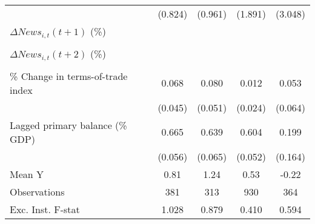 {\begin{tabular}{l*{4}{c}}
                    &     (0.824)         &     (0.961)         &     (1.891)         &     (3.048)         \\
\addlinespace
$ \Delta News_{i,t}(t+1)$ (\%)&                     &                     &                     &                     \\
                    &                     &                     &                     &                     \\
\addlinespace
$ \Delta News_{i,t}(t+2)$ (\%)&                     &                     &                     &                     \\
                    &                     &                     &                     &                     \\
\addlinespace
\% Change in terms-of-trade index&       0.068         &       0.080         &       0.012         &       0.053         \\
                    &     (0.045)         &     (0.051)         &     (0.024)         &     (0.064)         \\
\addlinespace
Lagged primary balance (\% GDP)&       0.665\sym{***}&       0.639\sym{***}&       0.604\sym{***}&       0.199         \\
                    &     (0.056)         &     (0.065)         &     (0.052)         &     (0.164)         \\
\midrule
Mean Y              &        0.81         &        1.24         &        0.53         &       -0.22         \\
Observations        &         381         &         313         &         930         &         364         \\
Exc. Inst. F-stat   &       1.028         &       0.879         &       0.410         &       0.594         \\
\bottomrule
\end{tabular}
}
